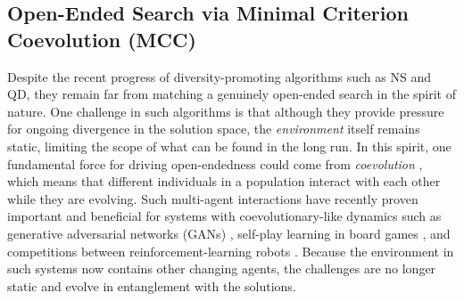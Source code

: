 \documentclass{article}
\newcommand{\ks}[1]{\comments{\textcolor{purple}{[Ken: #1]}}}
\newcommand{\rw}[1]{\comments{\textcolor{blue}{[Rui: #1]}}}
\newcommand{\comments}[1]{#1}
\begin{document}
\subsection{Open-Ended Search via Minimal Criterion Coevolution (MCC)}
\label{mcc overview}
Despite the recent progress of diversity-promoting algorithms such as NS and QD, they remain far from matching a genuinely open-ended search in the spirit of nature. 
One challenge in such algorithms is that although they provide pressure for ongoing divergence
in the solution space, the \emph{environment} itself remains static, limiting the scope
of what can be found in the long run.
In this spirit, one fundamental force for driving open-endedness could come from \emph{coevolution} \cite{popovici:hnc12}, which means that different individuals in a population interact with each other while they are evolving. Such multi-agent interactions have recently proven important and beneficial for systems with coevolutionary-like dynamics such as generative adversarial networks (GANs) \cite{goodfellow_generative_2014}, self-play learning in board games \cite{silver2017mastering}, and competitions between reinforcement-learning robots \cite{selfplay:arxiv18}.  Because the environment in such systems now contains other changing agents, the challenges are no longer static and evolve in entanglement with the solutions. 
\end{document}
